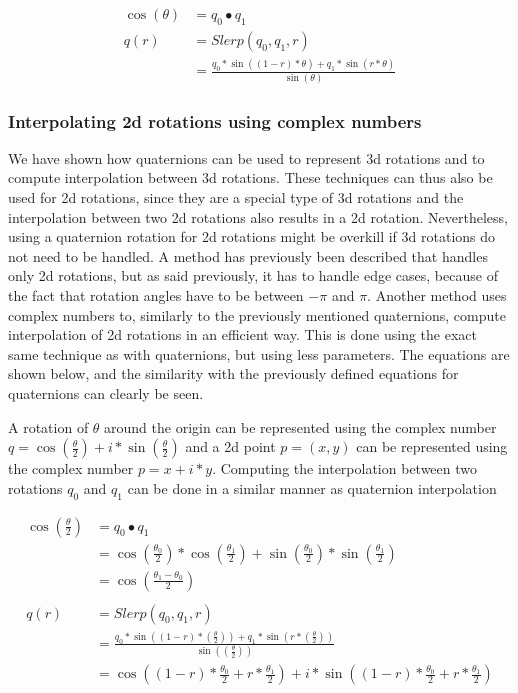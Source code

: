 \begin{equation}
\begin{split}
    \cos(\theta)    & = q_0 \bullet q_1 \\
    q(r)            & = Slerp(q_0, q_1, r) \\
                    & = \frac{q_0 * \sin((1-r)*\theta) + q_1 * \sin(r*\theta)}{\sin(\theta)}
\end{split}
\end{equation}
    
\subsubsection{Interpolating 2d rotations using complex numbers}

We have shown how quaternions can be used to represent 3d rotations and to compute interpolation between 3d rotations. These techniques can thus also be used for 2d rotations, since they are a special type of 3d rotations and the interpolation between two 2d rotations also results in a 2d rotation. Nevertheless, using a quaternion rotation for 2d rotations might be overkill if 3d rotations do not need to be handled. A method has previously been described that handles only 2d rotations, but as said previously, it has to handle edge cases, because of the fact that rotation angles have to be between \( - \pi \) and \( \pi \). Another method uses complex numbers to, similarly to the previously mentioned quaternions, compute interpolation of 2d rotations in an efficient way. This is done using the exact same technique as with quaternions, but using less parameters. The equations are shown below, and the similarity with the previously defined equations for quaternions can clearly be seen.

A rotation of $\theta$ around the origin can be represented using the complex number \( q = \cos(\frac{\theta}{2}) + i*\sin(\frac{\theta}{2}) \) and a 2d point \( p = (x, y) \) can be represented using the complex number \( p = x + i*y \). Computing the interpolation between two rotations \( q_0 \) and \( q_1 \) can be done in a similar manner as quaternion interpolation

\begin{equation}
\begin{split}
\cos(\frac{\theta}{2})  &= q_0 \bullet q_1 \\
                        &= \cos(\frac{\theta_0}{2})*\cos(\frac{\theta_1}{2}) + \sin(\frac{\theta_0}{2})*\sin(\frac{\theta_1}{2}) \\
                        &= \cos(\frac{\theta_1 - \theta_0}{2}) \\
                        & \\
q(r)                &= Slerp(q_0, q_1, r) \\
                &= \frac{q_0 * \sin((1-r)*(\frac{\theta}{2})) + q_1 * \sin(r*(\frac{\theta}{2}))}{\sin((\frac{\theta}{2}))} \\
                &= \cos((1-r)*\frac{\theta_0}{2} + r*\frac{\theta_1}{2}) + i*\sin((1-r)*\frac{\theta_0}{2} + r*\frac{\theta_1}{2}) \\
\end{split}
\end{equation}

